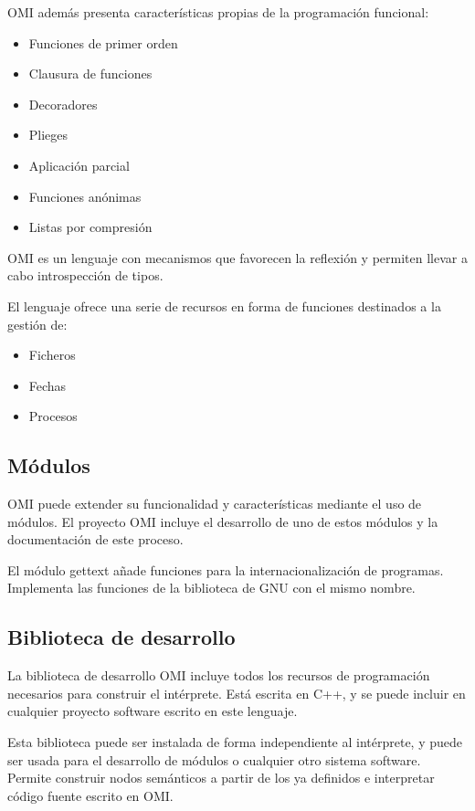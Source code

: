 OMI además presenta características propias de la programación funcional:

\begin{itemize}
\item Funciones de primer orden
\item Clausura de funciones
\item Decoradores
\item Plieges
\item Aplicación parcial
\item Funciones anónimas
\item Listas por compresión
\end{itemize}

OMI es un lenguaje con mecanismos que favorecen la reflexión y permiten llevar a cabo introspección de tipos. 

El lenguaje ofrece una serie de recursos en forma de funciones destinados a la gestión de:

\begin{itemize}
  \item Ficheros
  \item Fechas
  \item Procesos
\end{itemize}
  
\subsection{Módulos}
OMI puede extender su funcionalidad y características mediante el uso de módulos. El proyecto OMI incluye 
el desarrollo de uno de estos módulos y la documentación de este proceso.

El módulo gettext añade funciones para la internacionalización de programas. Implementa las funciones de la biblioteca de GNU
con el mismo nombre.

\subsection{Biblioteca de desarrollo}
La biblioteca de desarrollo OMI incluye todos los recursos de programación necesarios para construir el intérprete. 
Está escrita en C++, y se puede incluir en cualquier proyecto software escrito en este lenguaje.  

Esta biblioteca puede ser instalada de forma independiente al intérprete, y puede ser usada para el desarrollo de 
módulos o cualquier otro sistema software. Permite construir nodos semánticos a partir de los ya definidos e 
interpretar código fuente escrito en OMI.

